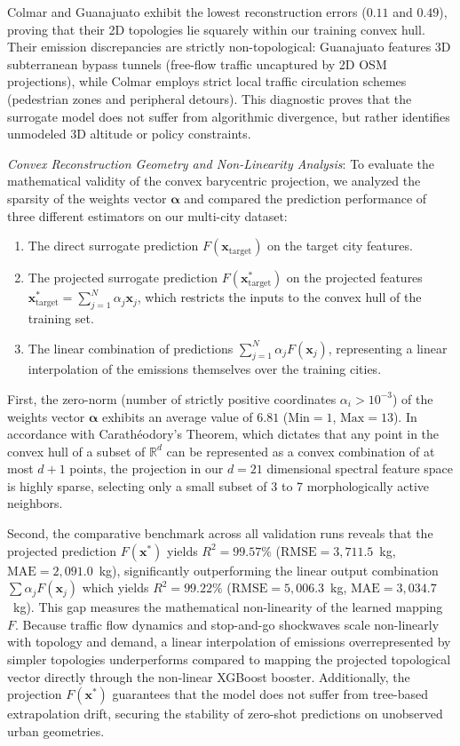 \documentclass[lettersize,journal]{IEEEtran}
\begin{document}
Colmar and Guanajuato exhibit the lowest reconstruction errors ($0.11$ and $0.49$), proving that their 2D topologies lie squarely within our training convex hull. Their emission discrepancies are strictly non-topological: Guanajuato features 3D subterranean bypass tunnels (free-flow traffic uncaptured by 2D OSM projections), while Colmar employs strict local traffic circulation schemes (pedestrian zones and peripheral detours). This diagnostic proves that the surrogate model does not suffer from algorithmic divergence, but rather identifies unmodeled 3D altitude or policy constraints.

\textit{Convex Reconstruction Geometry and Non-Linearity Analysis}:
To evaluate the mathematical validity of the convex barycentric projection, we analyzed the sparsity of the weights vector $\boldsymbol{\alpha}$ and compared the prediction performance of three different estimators on our multi-city dataset:
\begin{enumerate}
    \item The direct surrogate prediction $F(\mathbf{x}_{\text{target}})$ on the target city features.
    \item The projected surrogate prediction $F(\mathbf{x}^*_{\text{target}})$ on the projected features $\mathbf{x}^*_{\text{target}} = \sum_{j=1}^N \alpha_j \mathbf{x}_j$, which restricts the inputs to the convex hull of the training set.
    \item The linear combination of predictions $\sum_{j=1}^N \alpha_j F(\mathbf{x}_j)$, representing a linear interpolation of the emissions themselves over the training cities.
\end{enumerate}
First, the zero-norm (number of strictly positive coordinates $\alpha_i > 10^{-3}$) of the weights vector $\boldsymbol{\alpha}$ exhibits an average value of $6.81$ ($\text{Min} = 1$, $\text{Max} = 13$). In accordance with Carathéodory's Theorem, which dictates that any point in the convex hull of a subset of $\mathbb{R}^d$ can be represented as a convex combination of at most $d+1$ points, the projection in our $d=21$ dimensional spectral feature space is highly sparse, selecting only a small subset of 3 to 7 morphologically active neighbors.

Second, the comparative benchmark across all validation runs reveals that the projected prediction $F(\mathbf{x}^*)$ yields $R^2 = 99.57\%$ ($\text{RMSE} = 3,711.5$~kg, $\text{MAE} = 2,091.0$~kg), significantly outperforming the linear output combination $\sum \alpha_j F(\mathbf{x}_j)$ which yields $R^2 = 99.22\%$ ($\text{RMSE} = 5,006.3$~kg, $\text{MAE} = 3,034.7$~kg). This gap measures the mathematical non-linearity of the learned mapping $F$. Because traffic flow dynamics and stop-and-go shockwaves scale non-linearly with topology and demand, a linear interpolation of emissions overrepresented by simpler topologies underperforms compared to mapping the projected topological vector directly through the non-linear XGBoost booster. Additionally, the projection $F(\mathbf{x}^*)$ guarantees that the model does not suffer from tree-based extrapolation drift, securing the stability of zero-shot predictions on unobserved urban geometries.
\end{document}
